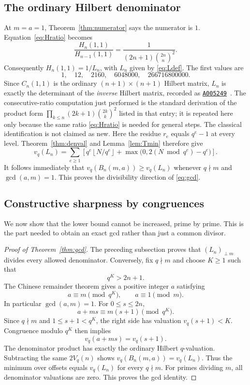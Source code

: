 \documentclass[11pt,a4paper]{article}
\numberwithin{equation}{section}
\theoremstyle{definition}
\theoremstyle{remark}
\newcommand{\floor}[1]{\left\lfloor#1\right\rfloor}
\newcommand{\OEIS}[1]{\href{https://oeis.org/#1}{\texttt{#1}}}
\begin{document}
\subsection{The ordinary Hilbert denominator}
At $m=a=1$, Theorem~\ref{thm:numerator} says the numerator is $1$. Equation~\eqref{eq:Hratio} becomes
\[
 \frac{H_n(1,1)}{H_{n-1}(1,1)}
 =\frac1{(2n+1)\binom{2n}{n}^2}.
\]
Consequently $H_n(1,1)=1/L_n$, with $L_n$ given by \eqref{eq:Ldef}. The first values are
\[
 1,\quad12,\quad2160,\quad6048000,\quad266716800000.
\]
Since $C_n(1,1)$ is the ordinary $(n+1)\times(n+1)$ Hilbert matrix, $L_n$ is exactly the determinant of the \emph{inverse} Hilbert matrix, recorded as \OEIS{A005249}~\cite{oeis5249}. The consecutive-ratio computation just performed is the standard derivation of the product form $\prod_{k\leq n}(2k+1)\binom{2k}{k}^2$ listed in that entry; it is repeated here only because the same ratio \eqref{eq:Hratio} is needed for general steps. The classical identification is not claimed as new.
Here the residue $r_e$ equals $q^e-1$ at every level. Theorem~\ref{thm:denval} and Lemma~\ref{lem:Tmin} therefore give
\begin{equation}\label{eq:Lval}
 v_q(L_n)=\sum_{e\geq1}\left[
 q^e\floor{N/q^e}+\max\bigl(0,2(N\bmod q^e)-q^e\bigr)
 \right].
\end{equation}
It follows immediately that $v_q(B_n(m,a))\geq v_q(L_n)$ whenever $q\nmid m$ and $\gcd(a,m)=1$. This proves the divisibility direction of \eqref{eq:gcd}.

\subsection{Constructive sharpness by congruences}
We now show that the lower bound cannot be increased, prime by prime. This is the part needed to obtain an exact gcd rather than just a common divisor.

\begin{proof}[Proof of Theorem~\ref{thm:gcd}]
The preceding subsection proves that $(L_n)_{\perp m}$ divides every allowed denominator. Conversely, fix $q\nmid m$ and choose $K\geq1$ such that
\[
 q^K>2n+1.
\]
The Chinese remainder theorem gives a positive integer $a$ satisfying
\begin{equation}\label{eq:crt}
 a\equiv m\pmod{q^K},\qquad a\equiv1\pmod m.
\end{equation}
In particular $\gcd(a,m)=1$. For $0\leq s\leq2n$,
\[
 a+ms\equiv m(s+1)\pmod{q^K}.
\]
Since $q\nmid m$ and $1\leq s+1<q^K$, the right side has valuation $v_q(s+1)<K$. Congruence modulo $q^K$ then implies
\[
 v_q(a+ms)=v_q(s+1).
\]
The denominator product has exactly the ordinary Hilbert $q$-valuation. Subtracting the same $2V_q(n)$ shows
$v_q(B_n(m,a))=v_q(L_n)$. Thus the minimum over offsets equals $v_q(L_n)$ for every $q\nmid m$. For primes dividing $m$, all denominator valuations are zero. This proves the gcd identity.
\end{proof}
\end{document}
